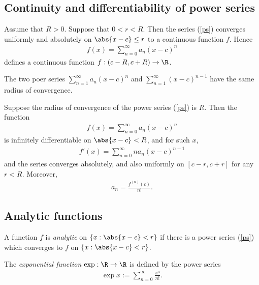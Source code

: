 \documentclass{article}
\begin{document}
\subsection{Continuity and differentiability of power series}

\begin{theorem}[Notes 3.2]
	Assume that $R>0$. Suppose that $0<r<R$. Then the series (\ref{ps}) converges
	uniformly and absolutely on $\abs{x-c}\leq r$ to a continuous function $f$.
	Hence
	\begin{align*}
		f(x) = \sum_{n=0}^\infty a_n(x-c)^n
	\end{align*}
	defines a continuous function $f:(c-R, c+R)\to\R$.
\end{theorem}

\begin{lemma}[Notes 3.1]
	The two poer series $\sum_{n=1}^\infty a_n(x-c)^n$ and $\sum_{n=1}^\infty (x-c)^{n-1}$
	have the same radius of convergence.
\end{lemma}

\begin{theorem}[Notes 3.3]
	Suppose the radius of convergence of the power series (\ref{ps}) is $R$. Then
	the function
	\begin{align*}
		f(x) = \sum_{n=0}^\infty a_n(x-c)^n
	\end{align*}
	is infinitely differentiable on $\abs{x-c} < R$, and for such $x$,
	\begin{align*}
		f'(x) = \sum_{n=0}^\infty na_n(x-c)^{n-1}
	\end{align*}
	and the series converges absolutely, and also uniformly on $[c-r, c+r]$ for any
	$r<R$. Moreover,
	\begin{align*}
		a_n = \frac{f^{(n)}(c)}{n!}.
	\end{align*}
\end{theorem}

\subsection{Analytic functions}

\begin{definition}
	A function $f$ is \emph{analytic} on $\{x: \abs{x-c}<r\}$ if there is a power
	series (\ref{ps}) which converges to $f$ on $\{x: \abs{x-c}<r\}$.
\end{definition}

\begin{definition}
	The \emph{exponential function} $\exp : \R\to\R$ is defined by the power series
	\begin{align*}
		\exp x := \sum_{n=0}^\infty \frac{x^n}{n!}.
	\end{align*}
\end{definition}
\end{document}
